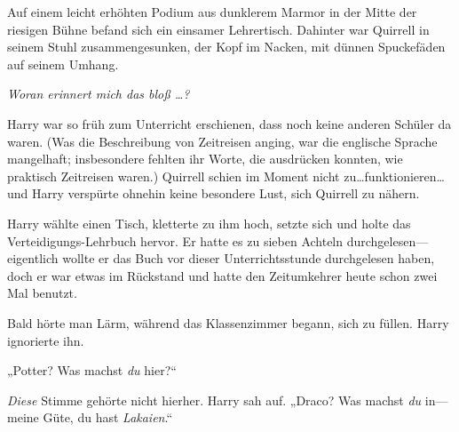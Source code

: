 Auf einem leicht erhöhten Podium aus dunklerem Marmor in der Mitte der riesigen Bühne befand sich ein einsamer Lehrertisch. Dahinter war Quirrell in seinem Stuhl zusammengesunken, der Kopf im Nacken, mit dünnen Spuckefäden auf seinem Umhang.

\emph{Woran erinnert mich das bloß …?}

Harry war so früh zum Unterricht erschienen, dass noch keine anderen Schüler da waren. (Was die Beschreibung von Zeitreisen anging, war die englische Sprache mangelhaft; insbesondere fehlten ihr Worte, die ausdrücken konnten, wie praktisch Zeitreisen waren.) Quirrell schien im Moment nicht zu…funktionieren…und Harry verspürte ohnehin keine besondere Lust, sich Quirrell zu nähern.

Harry wählte einen Tisch, kletterte zu ihm hoch, setzte sich und holte das Verteidigungs-Lehrbuch hervor. Er hatte es zu sieben Achteln durchgelesen—eigentlich wollte er das Buch vor dieser Unterrichtsstunde durchgelesen haben, doch er war etwas im Rückstand und hatte den Zeitumkehrer heute schon zwei Mal benutzt.

Bald hörte man Lärm, während das Klassenzimmer begann, sich zu füllen. Harry ignorierte ihn.

„Potter? Was machst \emph{du} hier?“

\emph{Diese} Stimme gehörte nicht hierher. Harry sah auf. „Draco? Was machst \emph{du} in—meine Güte, du hast \emph{Lakaien}.“

